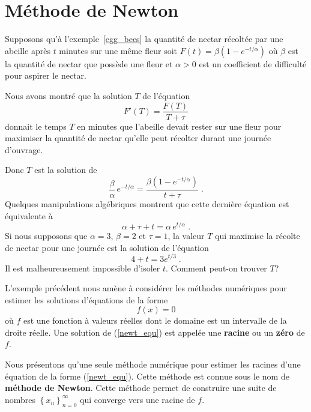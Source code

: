 {%

\section{Méthode de Newton \life \eng}\label{MethNewtonSect}

\begin{egg}[\life]
Supposons qu'à l'exemple~\ref{egg_bees} la quantité de nectar récoltée
par une abeille après $t$ minutes sur une même fleur soit
$F(t) = \beta (1-e^{-t/\alpha})$ où $\beta$ est la quantité de nectar
que possède une fleur et $\alpha>0$ est un coefficient de difficulté
pour aspirer le nectar.

Nous avons montré que la solution $T$ de l'équation
\[
F'(T) = \frac{F(T)}{T+\tau}
\]
donnait le temps $T$ en minutes que l'abeille devait rester sur une
fleur pour maximiser la quantité de nectar qu'elle peut récolter
durant une journée d'ouvrage.

Donc $T$ est la solution de
\[
\frac{\beta}{\alpha}\, e^{-t/\alpha} =
 \frac{\beta(1-e^{-t/\alpha})}{t+\tau} \; .
\]
Quelques manipulations algébriques montrent que cette dernière
équation est équivalente à
\[
\alpha + \tau + t = \alpha\, e^{t/\alpha} \; .
\]
Si nous supposons que $\alpha=3$, $\beta=2$ et $\tau=1$, la valeur $T$ qui
maximise la récolte de nectar pour une journée est la solution de
l'équation
\[
4 + t = 3 e^{t/3} \; .
\]
Il est malheureusement impossible d'isoler $t$.  Comment peut-on
trouver $T$?
\label{newt_bees}
\end{egg}

L'exemple précédent nous amène à considérer les méthodes numériques
pour estimer les solutions d'équations de la forme
\begin{equation} \label{newt_equ}
f(x)  = 0
\end{equation}
où $f$ est une fonction à valeurs réelles dont le domaine est un
intervalle de la droite réelle.  Une solution de (\ref{newt_equ}) est
appelée une {\bfseries racine} ou un {\bfseries zéro} de $f$.
 

Nous présentons qu'une seule méthode numérique pour estimer les
racines d'une équation de la forme (\ref{newt_equ}).  Cette méthode
est connue sous le nom de {\bfseries méthode de Newton}.  Cette
méthode permet de construire une suite de nombres
$\displaystyle \left\{ x_n \right\}_{n=0}^\infty$ qui converge vers une
racine de $f$.

}
